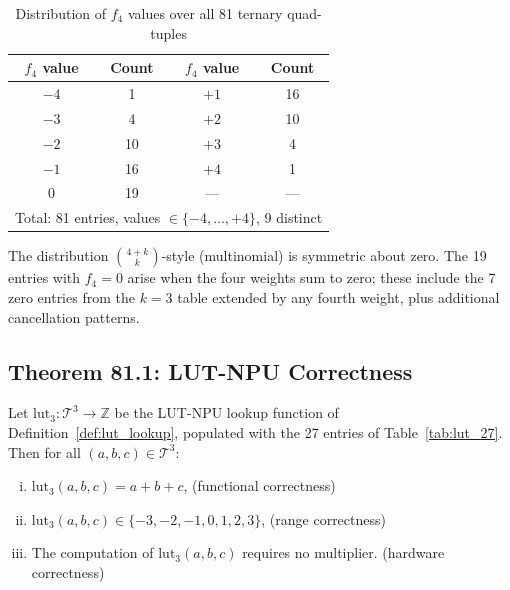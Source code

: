 \begin{table}[ht]
\centering
\caption{Distribution of $f_4$ values over all 81 ternary quad-tuples}
\label{tab:lut_81_summary}
\begin{tabular}{cc|cc}
\hline
$f_4$ value & Count & $f_4$ value & Count \\
\hline
$-4$ & 1  & $+1$ & 16 \\
$-3$ & 4  & $+2$ & 10 \\
$-2$ & 10 & $+3$ & 4  \\
$-1$ & 16 & $+4$ & 1  \\
$ 0$ & 19 & --- & --- \\
\hline
\multicolumn{4}{c}{Total: 81 entries, values $\in \{-4,\ldots,+4\}$, 9 distinct} \\
\hline
\end{tabular}
\end{table}

\noindent The distribution $\binom{4+k}{k}$-style (multinomial) is symmetric
about zero.  The 19 entries with $f_4 = 0$ arise when the four weights sum to
zero; these include the 7 zero entries from the $k=3$ table extended by any
fourth weight, plus additional cancellation patterns.

\subsection{Theorem 81.1: LUT-NPU Correctness}

\begin{theorem}
\label{thm:lut_correctness}
Let $\mathrm{lut}_3 : \mathcal{T}^3 \to \mathbb{Z}$ be the LUT-NPU lookup
function of Definition~\ref{def:lut_lookup}, populated with the 27 entries
of Table~\ref{tab:lut_27}.  Then for all $(a,b,c) \in \mathcal{T}^3$:
\begin{enumerate}[(i)]
  \item $\mathrm{lut}_3(a,b,c) = a + b + c$, \quad (functional correctness)
  \item $\mathrm{lut}_3(a,b,c) \in \{-3,-2,-1,0,1,2,3\}$, \quad (range correctness)
  \item The computation of $\mathrm{lut}_3(a,b,c)$ requires no multiplier. \quad (hardware correctness)
\end{enumerate}
\end{theorem}

